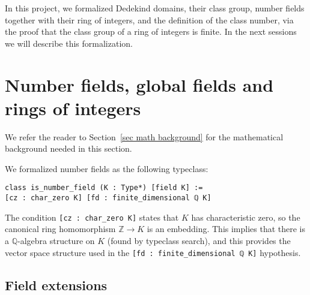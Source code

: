 \documentclass[a4paper,USenglish,cleveref, autoref, thm-restate]{lipics-v2021}
\newcommand{\lean}[1]{\texttt{#1}\xspace} %
\newcommand*{\OK}[1][K]{\mathcal{O}_{#1}}
\newcommand{\Q}{\mathbb{Q}}
\newcommand{\Z}{\mathbb{Z}}
\begin{document}
 In this project, we formalized Dedekind domains, their class group, number fields together with their ring of integers, and the definition of the class number, via the proof that the class group of a ring of integers is finite. In the next sessions we will describe this formalization.






\section{Number fields, global fields and rings of integers}

We refer the reader to Section~\ref{sec math background} for the mathematical background needed in this section.

We formalized number fields as the following typeclass:
\begin{lstlisting}
class is_number_field (K : Type*) [field K] :=
[cz : char_zero K] [fd : finite_dimensional ℚ K]
\end{lstlisting}
The condition \lean{[cz : char\_zero K]} states that $K$ has characteristic zero, so the canonical ring homomorphism $\Z \to K$ is an embedding.
This implies that there is a $\Q$-algebra structure on $K$ (found by typeclass search), and this provides the vector space structure used in the \lean{[fd : finite\_dimensional ℚ K]} hypothesis.

\subsection{Field extensions}
\end{document}
